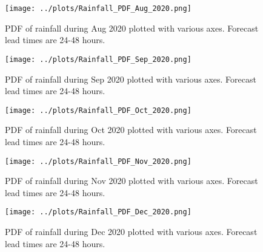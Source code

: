 \documentclass[12pt]{article}
\begin{document}
\begin{figure}
\begin{center}
\texttt{[image: ../plots/Rainfall\_PDF\_Aug\_2020.png]}
\end{center}
\caption{PDF of rainfall during Aug 2020 plotted with various axes. Forecast lead times are 24-48 hours.}
\end{figure}

\begin{figure}
\begin{center}
\texttt{[image: ../plots/Rainfall\_PDF\_Sep\_2020.png]}
\end{center}
\caption{PDF of rainfall during Sep 2020 plotted with various axes. Forecast lead times are 24-48 hours.}
\end{figure}

\begin{figure}
\begin{center}
\texttt{[image: ../plots/Rainfall\_PDF\_Oct\_2020.png]}
\end{center}
\caption{PDF of rainfall during Oct 2020 plotted with various axes. Forecast lead times are 24-48 hours.}
\end{figure}

\begin{figure}
\begin{center}
\texttt{[image: ../plots/Rainfall\_PDF\_Nov\_2020.png]}
\end{center}
\caption{PDF of rainfall during Nov 2020 plotted with various axes. Forecast lead times are 24-48 hours.}
\end{figure}

\begin{figure}
\begin{center}
\texttt{[image: ../plots/Rainfall\_PDF\_Dec\_2020.png]}
\end{center}
\caption{PDF of rainfall during Dec 2020 plotted with various axes. Forecast lead times are 24-48 hours.}
\end{figure}
\end{document}
